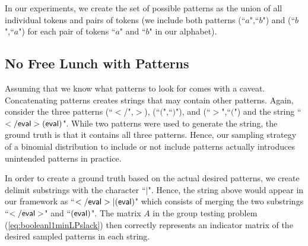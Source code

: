 In our experiments, we create the set of possible patterns as the union of all individual tokens and pairs of tokens (we include both patterns (``$a$",``$b$") and (``$b$",``$a$") for each pair of tokens ``$a$" and ``$b$" in our alphabet).

\subsection{No Free Lunch with Patterns}
Assuming that we know what patterns to look for comes with a caveat. Concatenating patterns creates strings that may contain other patterns. Again, consider the three patterns (``$<$/",$>$), (``$($",``$)$"), and (``$>$",``$($") and the string  ``$\sf{</eval>(eval)}$". While two patterns were used to generate the string, the ground truth is that it contains all three patterns. Hence, our sampling strategy of a binomial distribution to include or not include patterns actually introduces unintended patterns in practice. 

In order to create a ground truth based on the actual desired patterns, we create delimit substrings with the character ``$|$".  Hence, the string above would appear in our framework as 
``$\sf{</eval>|(eval)}$" which consists of merging the two substrings ``$\sf{</eval>}$" and ``$\sf{(eval)}$". The matrix $A$ in the group testing problem (\ref{eq:booleanl1minLPslack}) then correctly represents an indicator matrix of the desired sampled patterns in each string.

